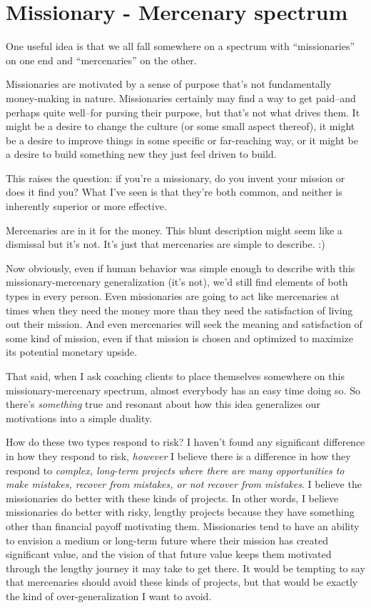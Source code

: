 \section{Missionary - Mercenary spectrum}

One useful idea is that we all fall somewhere on a spectrum with ``missionaries'' on one end and ``mercenaries'' on the other.

Missionaries are motivated by a sense of purpose that's not fundamentally money-making in nature. Missionaries certainly may find a way to get paid--and perhaps quite well--for pursing their purpose, but that's not what drives them. It might be a desire to change the culture (or some small aspect thereof), it might be a desire to improve things in some specific or far-reaching way, or it might be a desire to build something new they just feel driven to build.

This raises the question: if you're a missionary, do you invent your mission or does it find you? What I've seen is that they're both common, and neither is inherently superior or more effective.

Mercenaries are in it for the money. This blunt description might seem like a dismissal but it's not. It's just that mercenaries are simple to describe. :)

Now obviously, even if human behavior was simple enough to describe with this missionary-mercenary generalization (it's not), we'd still find elements of both types in every person. Even missionaries are going to act like mercenaries at times when they need the money more than they need the satisfaction of living out their mission. And even mercenaries will seek the meaning and satisfaction of some kind of mission, even if that mission is chosen and optimized to maximize its potential monetary upside.

That said, when I ask coaching clients to place themselves somewhere on this missionary-mercenary spectrum, almost everybody has an easy time doing so. So there's \emph{something} true and resonant about how this idea generalizes our motivations into a simple duality.

How do these two types respond to risk? I haven't found any significant difference in how they respond to risk, \emph{however} I believe there is a difference in how they respond to \emph{complex, long-term projects where there are many opportunities to make mistakes, recover from mistakes, or not recover from mistakes}. I believe the missionaries do better with these kinds of projects. In other words, I believe missionaries do better with risky, lengthy projects because they have something other than financial payoff motivating them. Missionaries tend to have an ability to envision a medium or long-term future where their mission has created significant value, and the vision of that future value keeps them motivated through the lengthy journey it may take to get there. It would be tempting to say that mercenaries should avoid these kinds of projects, but that would be exactly the kind of over-generalization I want to avoid.

